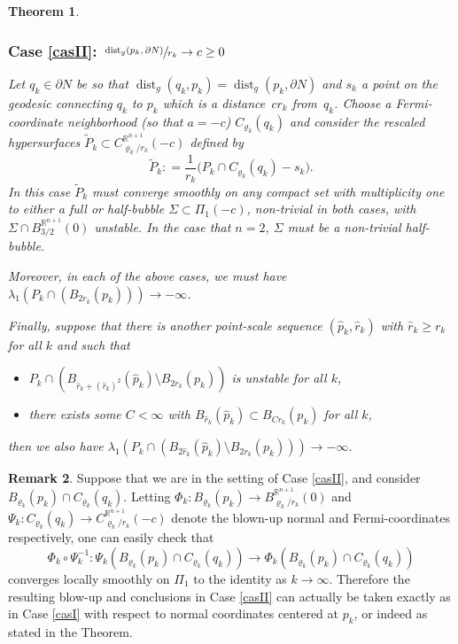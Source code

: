 \documentclass[10pt]{amsart}
\newcounter{cas}
\DeclareMathOperator{\dist}{dist}
\newtheorem{thm}{Theorem}
\theoremstyle{definition}
\newtheorem{rmk}[thm]{Remark}
\newcommand{\R}{\mathbb{R}}
\begin{document}
\begin{thm}
\subsubsection*{\label{casII}Case \ref{casII}: $\sfrac{\dist_g(p_k,\partial N)}{r_k}\to c\geq 0$}
Let $q_k\in\partial N$ be so that $\dist_g(q_k,p_k)=\dist_g(p_k,\partial N)$ and $s_k$ a point on the geodesic connecting $q_k$ to $p_k$ which is a distance~$cr_k$ from~$q_k$. Choose a Fermi-coordinate neighborhood (so that $a=-c$) $C_{\varrho_k}(q_k)$ and consider the rescaled hypersurfaces $\widetilde{P}_k \subset C^{\R^{n+1}}_{\varrho_k/r_k}(-c)$ defined by
\begin{equation*}
\widetilde{P}_k : = \frac{1}{r_k} \big(P_k\cap C_{\varrho_k}(q_k)- s_k\big).
\end{equation*} In this case $\widetilde{P}_k$ must converge smoothly on any compact set with multiplicity one to \emph{either a full or half-bubble} $\Sigma\subset \Pi_1(-c)$, non-trivial in both cases, with $\Sigma\cap B^{\R^{n+1}}_{3/2}(0)$ unstable.
In the case that $n=2$, $\Sigma$ must be a non-trivial half-bubble.

Moreover, in each of the above cases, we must have $\lambda_1(P_k \cap (B_{2r_k}(p_k)))\to -\infty$.

Finally, suppose that there is another point-scale sequence $(\widehat{p}_k, \widehat{r}_k)$ with $\widehat{r}_k \geq r_k$ for all $k$ and such that
\begin{itemize}
\item $P_k\cap (B_{\widehat{r}_k+ (\widehat{r}_k)^2}(\widehat{p}_k)\setminus B_{2r_k}(p_k))$ is unstable for all $k$,
\item there exists some $C<\infty$ with $B_{\widehat{r}_k}(\widehat{p}_k)\subset B_{Cr_k}(p_k)$ for all $k$,
\end{itemize}
then we also have $\lambda_1(P_k\cap (B_{2\widehat{r}_k}(\widehat{p}_k)\setminus B_{2r_k}(p_k))) \to -\infty$.
\addtocounter{cas}{-2}
\end{thm}

\begin{rmk}\label{rmk:coord}
Suppose that we are in the setting of Case \ref{casII}, and consider $B_{\varrho_k}(p_k)\cap C_{\varrho_k}(q_k)$. Letting $\Phi_k : B_{\varrho_k}(p_k) \to B^{\R^{n+1}}_{\varrho_k/r_k}(0)$ and $\Psi_k : C_{\varrho_k}(q_k)\to C^{\R^{n+1}}_{\varrho_k/r_k}(-c)$ denote the blown-up normal and Fermi-coordinates respectively, one can easily check that
$$\Phi_k\circ \Psi_k^{-1}: \Psi_k(B_{\varrho_k}(p_k)\cap C_{\varrho_k}(q_k)) \to \Phi_k(B_{\varrho_k}(p_k)\cap C_{\varrho_k}(q_k))$$
converges locally smoothly on $\Pi_1$ to the identity as $k\to \infty$. Therefore the resulting blow-up and conclusions in Case \ref{casII} can actually be taken exactly as in Case \ref{casI} with respect to normal coordinates centered at $p_k$, or indeed as stated in the Theorem.
\end{rmk}
\end{document}
